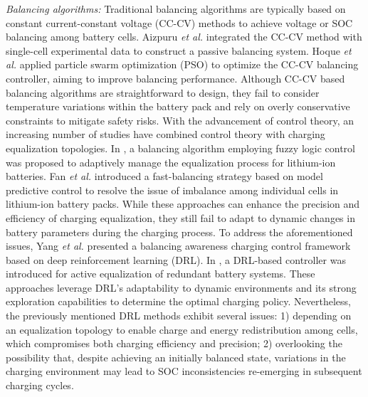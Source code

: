 \documentclass[journal]{IEEEtran}
\begin{document}
\noindent\textit{Balancing algorithms:} Traditional balancing algorithms are typically based on constant current-constant voltage (CC-CV) methods to achieve voltage or SOC balancing among battery cells. Aizpuru {\it et al.} \cite{13} integrated the CC-CV method with single-cell experimental data to construct a passive balancing system. Hoque {\it et al.} \cite{14} applied particle swarm optimization (PSO) to optimize the CC-CV balancing controller, aiming to improve balancing performance. Although CC-CV based balancing algorithms are straightforward to design, they fail to consider temperature variations within the battery pack and rely on overly conservative constraints to mitigate safety risks. With the advancement of control theory, an increasing number of studies have combined control theory with charging equalization topologies. In \cite{15}, a balancing algorithm employing fuzzy logic control was proposed to adaptively manage the equalization process for lithium-ion batteries. Fan {\it et al.} \cite{16} introduced a fast-balancing strategy based on model predictive control to resolve the issue of imbalance among individual cells in lithium-ion battery packs. While these approaches can enhance the precision and efficiency of charging equalization, they still fail to adapt to dynamic changes in battery parameters during the charging process. To address the aforementioned issues, Yang {\it et al.} \cite{17} presented a balancing awareness charging control framework based on deep reinforcement learning (DRL). In \cite{18}, a DRL-based controller was introduced for active equalization of redundant battery systems. These approaches leverage DRL’s adaptability to dynamic environments and its strong exploration capabilities to determine the optimal charging policy. Nevertheless, the previously mentioned DRL methods exhibit several issues: 1) depending on an equalization topology to enable charge and energy redistribution among cells, which compromises both charging efficiency and precision; 2) overlooking the possibility that, despite achieving an initially balanced state, variations in the charging environment may lead to SOC inconsistencies re-emerging in subsequent charging cycles.

\end{document}
